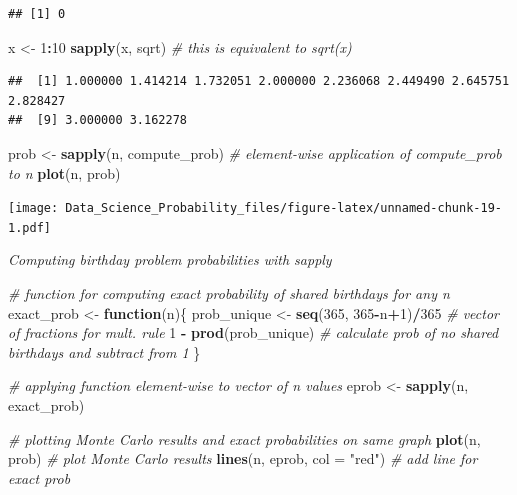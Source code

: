 \documentclass[
]{article}
\newenvironment{Shaded}{\begin{snugshade}}{\end{snugshade}}
\newcommand{\CommentTok}[1]{\textcolor[rgb]{0.56,0.35,0.01}{\textit{#1}}}
\newcommand{\ControlFlowTok}[1]{\textcolor[rgb]{0.13,0.29,0.53}{\textbf{#1}}}
\newcommand{\DataTypeTok}[1]{\textcolor[rgb]{0.13,0.29,0.53}{#1}}
\newcommand{\DecValTok}[1]{\textcolor[rgb]{0.00,0.00,0.81}{#1}}
\newcommand{\KeywordTok}[1]{\textcolor[rgb]{0.13,0.29,0.53}{\textbf{#1}}}
\newcommand{\NormalTok}[1]{#1}
\newcommand{\OperatorTok}[1]{\textcolor[rgb]{0.81,0.36,0.00}{\textbf{#1}}}
\newcommand{\StringTok}[1]{\textcolor[rgb]{0.31,0.60,0.02}{#1}}
\begin{document}
\begin{verbatim}
## [1] 0
\end{verbatim}

\begin{Shaded}
\begin{Highlighting}[]
\NormalTok{x \textless{}{-}}\StringTok{ }\DecValTok{1}\OperatorTok{:}\DecValTok{10}
\KeywordTok{sapply}\NormalTok{(x, sqrt)    }\CommentTok{\# this is equivalent to sqrt(x)}
\end{Highlighting}
\end{Shaded}

\begin{verbatim}
##  [1] 1.000000 1.414214 1.732051 2.000000 2.236068 2.449490 2.645751 2.828427
##  [9] 3.000000 3.162278
\end{verbatim}

\begin{Shaded}
\begin{Highlighting}[]
\NormalTok{prob \textless{}{-}}\StringTok{ }\KeywordTok{sapply}\NormalTok{(n, compute\_prob)    }\CommentTok{\# element{-}wise application of compute\_prob to n}
\KeywordTok{plot}\NormalTok{(n, prob)}
\end{Highlighting}
\end{Shaded}

\texttt{[image: Data\_Science\_Probability\_files/figure-latex/unnamed-chunk-19-1.pdf]}

\emph{Computing birthday problem probabilities with sapply}

\begin{Shaded}
\begin{Highlighting}[]
\CommentTok{\# function for computing exact probability of shared birthdays for any n}
\NormalTok{exact\_prob \textless{}{-}}\StringTok{ }\ControlFlowTok{function}\NormalTok{(n)\{}
\NormalTok{    prob\_unique \textless{}{-}}\StringTok{ }\KeywordTok{seq}\NormalTok{(}\DecValTok{365}\NormalTok{, }\DecValTok{365}\OperatorTok{{-}}\NormalTok{n}\OperatorTok{+}\DecValTok{1}\NormalTok{)}\OperatorTok{/}\DecValTok{365}   \CommentTok{\# vector of fractions for mult. rule}
    \DecValTok{1} \OperatorTok{{-}}\StringTok{ }\KeywordTok{prod}\NormalTok{(prob\_unique)    }\CommentTok{\# calculate prob of no shared birthdays and subtract from 1}
\NormalTok{\}}

\CommentTok{\# applying function element{-}wise to vector of n values}
\NormalTok{eprob \textless{}{-}}\StringTok{ }\KeywordTok{sapply}\NormalTok{(n, exact\_prob)}

\CommentTok{\# plotting Monte Carlo results and exact probabilities on same graph}
\KeywordTok{plot}\NormalTok{(n, prob)    }\CommentTok{\# plot Monte Carlo results}
\KeywordTok{lines}\NormalTok{(n, eprob, }\DataTypeTok{col =} \StringTok{"red"}\NormalTok{)    }\CommentTok{\# add line for exact prob}
\end{Highlighting}
\end{Shaded}
\end{document}

